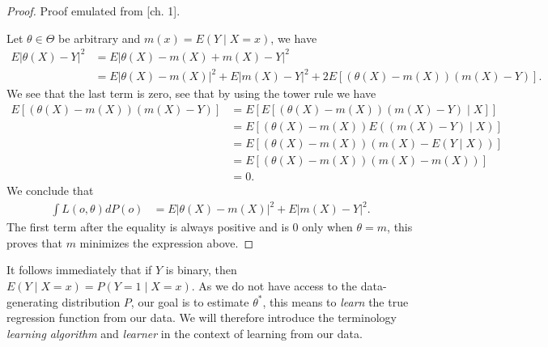 \documentclass[11pt, a4paper]{article}
\theoremstyle{definition}
\theoremstyle{remark}
\newcommand{\btheta}{\theta}
\begin{document}
\begin{proof}
    Proof emulated from \parencite{gyorfi2002distribution}[ch. 1]. 

    Let $ \btheta \in \Theta $ be arbitrary and $ m(x) = E(Y \mid X = x) $, we have 
    \begin{align*}
        E| \theta(X) - Y |^2 &= E| \theta(X) - m(X) + m(X) - Y |^2 \\
                             &= E| \theta(X) - m(X) |^2 + E| m(X) - Y |^2 + 2 E[ (\theta(X) - m(X))(m(X) - Y) ].
    \end{align*}
    We see that the last term is zero, see that by using the tower rule we have 
    \begin{align*}
        E[ (\theta(X) - m(X))(m(X) - Y) ] &= E[ E[ (\theta(X) - m(X))(m(X) - Y) \mid X] ] \\
                                                       &= E[ (\theta(X) - m(X)) E( (m(X) - Y) \mid X) ] \\
                                                       &= E[ (\theta(X) - m(X)) ( m(X) - E(Y \mid X)) ] \\
                                                       &= E[ (\theta(X) - m(X)) ( m(X) - m(X)) ] \\
                                                       &= 0.
    \end{align*}
    We conclude that 
    \begin{align*}
        \int L(o, \theta) d P(o) &= E| \theta(X) - m(X) |^2 + E | m(X) - Y |^2.
    \end{align*}
    The first term after the equality is always positive and is $ 0 $ only when $ \theta = m $, this proves that $ m $ minimizes the expression above. 
\end{proof}
It follows immediately that if $ Y $ is binary, then $ E(Y \mid X = x) = P(Y = 1 \mid X = x) $. As we do not have access to the data-generating distribution $ P $, our goal is to estimate $ \btheta^{*} $, this means to \textit{learn} the true regression function from our data. 
We will therefore introduce the terminology \textit{learning algorithm} and \textit{learner} in the context of learning from our data.  
\end{document}

